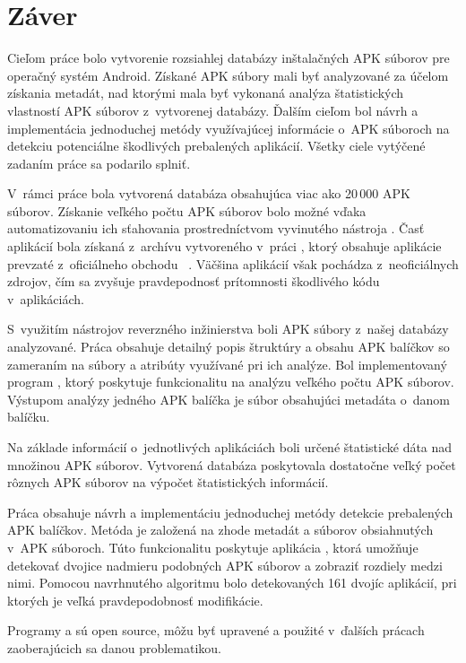 \chapter{Záver}
Cieľom práce bolo vytvorenie rozsiahlej databázy inštalačných APK súborov pre operačný systém Android. Získané APK súbory mali byť analyzované za účelom získania metadát, nad ktorými mala byť vykonaná analýza štatistických vlastností APK súborov z~vytvorenej databázy. Ďalším cieľom bol návrh a implementácia jednoduchej metódy využívajúcej informácie o~APK súboroch na detekciu potenciálne škodlivých prebalených aplikácií. Všetky ciele vytýčené zadaním práce sa podarilo splniť.

V~rámci práce bola vytvorená databáza obsahujúca viac ako 20\,000 APK súborov. Získanie veľkého počtu APK súborov bolo možné vďaka automatizovaniu ich sťahovania prostredníctvom vyvinutého nástroja . Časť aplikácií bola získaná z~archívu vytvoreného v~práci , ktorý obsahuje aplikácie prevzaté z~oficiálneho obchodu ~\cite{Viennot2014}. Väčšina aplikácií však pochádza z~neoficiálnych zdrojov, čím sa zvyšuje pravdepodnosť prítomnosti škodlivého kódu v~aplikáciách. 

S~využitím nástrojov reverzného inžinierstva boli APK súbory z~našej databázy analyzované. Práca obsahuje detailný popis štruktúry a obsahu APK balíčkov so zameraním na súbory a atribúty využívané pri ich analýze. Bol implementovaný program , ktorý poskytuje funkcionalitu na analýzu veľkého počtu APK súborov. Výstupom analýzy jedného APK balíčka je súbor obsahujúci metadáta o~danom balíčku.

Na základe informácií o~jednotlivých aplikáciách boli určené štatistické dáta nad množinou APK súborov. Vytvorená databáza poskytovala dostatočne veľký počet rôznych APK súborov na výpočet štatistických informácií.

Práca obsahuje návrh a implementáciu jednoduchej metódy detekcie prebalených APK balíčkov. Metóda je založená na zhode metadát a súborov obsiahnutých v~APK súboroch. Túto funkcionalitu poskytuje aplikácia , ktorá umožňuje detekovať dvojice nadmieru podobných APK súborov a zobraziť rozdiely medzi nimi. Pomocou navrhnutého algoritmu bolo detekovaných 161 dvojíc aplikácií, pri ktorých je veľká pravdepodobnosť modifikácie.

Programy  a  sú open source, môžu byť upravené a použité v~ďalších prácach zaoberajúcich sa danou problematikou. 
